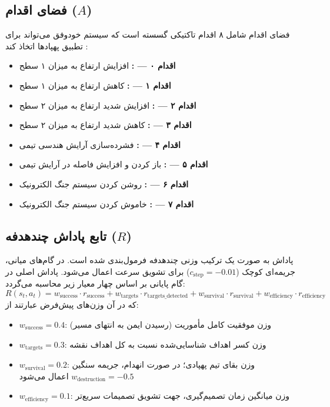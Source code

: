 \documentclass[oneside,openany,a4paper,12pt]{article}
\begin{document}
\subsection{فضای اقدام ($A$)}
فضای اقدام شامل ۸ اقدام تاکتیکی گسسته است که سیستم خودوفق می‌تواند برای تطبیق پهپادها اتخاذ کند :
\begin{itemize}
    \item \textbf{اقدام ۰ — :} افزایش ارتفاع به میزان ۱ سطح
    \item \textbf{اقدام ۱ — :} کاهش ارتفاع به میزان ۱ سطح
    \item \textbf{اقدام ۲ — :} افزایش شدید ارتفاع به میزان ۲ سطح
    \item \textbf{اقدام ۳ — :} کاهش شدید ارتفاع به میزان ۲ سطح
    \item \textbf{اقدام ۴ — :} فشرده‌سازی آرایش هندسی تیمی
    \item \textbf{اقدام ۵ — :} باز کردن و افزایش فاصله در آرایش تیمی
    \item \textbf{اقدام ۶ — :} روشن کردن سیستم جنگ الکترونیک 
    \item \textbf{اقدام ۷ — :} خاموش کردن سیستم جنگ الکترونیک 
\end{itemize}

\subsection{تابع پاداش چندهدفه ($R$)}
پاداش به صورت یک ترکیب وزنی چندهدفه فرمول‌بندی شده است. در گام‌های میانی، جریمه‌ای کوچک ($c_{\text{step}} = -0.01$) برای تشویق سرعت اعمال می‌شود. پاداش اصلی در گام پایانی بر اساس چهار معیار زیر محاسبه می‌گردد:
\begin{equation}
R(s_t, a_t) = w_{\text{success}} \cdot r_{\text{success}} + w_{\text{targets}} \cdot r_{\text{targets\_detected}} + w_{\text{survival}} \cdot r_{\text{survival}} + w_{\text{efficiency}} \cdot r_{\text{efficiency}}
\end{equation}
که در آن وزن‌های پیش‌فرض عبارتند از:
\begin{itemize}
    \item $w_{\text{success}} = 0.4$: وزن موفقیت کامل مأموریت (رسیدن ایمن به انتهای مسیر)
    \item $w_{\text{targets}} = 0.3$: وزن کسر اهداف شناسایی‌شده نسبت به کل اهداف نقشه
    \item $w_{\text{survival}} = 0.2$: وزن بقای تیم پهپادی؛ در صورت انهدام، جریمه سنگین $w_{\text{destruction}} = -0.5$ اعمال می‌شود
    \item $w_{\text{efficiency}} = 0.1$: وزن میانگین زمان تصمیم‌گیری، جهت تشویق تصمیمات سریع‌تر
\end{itemize}
\end{document}
